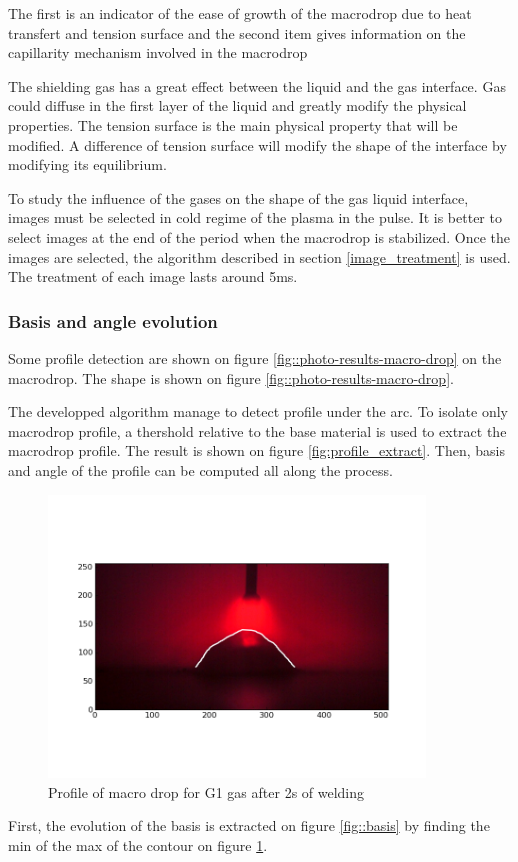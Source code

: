 \documentclass[12pt]{iopart}
\begin{document}
The first is an indicator of the ease of growth of the macrodrop due to
heat transfert and tension surface and the second  item gives information
 on the capillarity mechanism involved in the macrodrop


The shielding gas has a great effect between the liquid and the gas interface. Gas could diffuse in the
first layer of the liquid and greatly modify the physical properties. The tension surface is the main physical
property that will be modified. A difference of tension surface will modify the shape of the interface by modifying
its equilibrium.

 To study the influence of the gases on the shape of the gas liquid interface, images must be selected in cold
regime of the plasma in the pulse. It is better to select images at the end of the period when the macrodrop is
stabilized. Once the images are selected, the algorithm described in section \ref{image_treatment} is used.
The treatment of each image lasts around 5ms.
\subsubsection{Basis and angle evolution} 
Some profile detection are shown on figure \ref{fig::photo-results-macro-drop} on the macrodrop.
The shape is shown on figure \ref{fig::photo-results-macro-drop}.

 The developped algorithm manage to detect profile under the arc.
 To isolate only 
macrodrop profile, a thershold relative to the base material is used to extract the macrodrop profile.
The result is shown on figure \ref{fig:profile_extract}. Then, basis and angle of the profile can be computed
all along  the process.
\begin{figure}[h!]
\centering    
\includegraphics[width=10cm]{images/CO2_2s.png}
\caption{Profile of macro drop for G1 gas after 2s of welding}
\label{fig::profile_extract}
\end{figure}
First, the evolution of the basis is extracted on figure \ref{fig::basis} by finding 
the min of the max of the contour on figure \ref{fig::profile_extract}.
\end{document}
